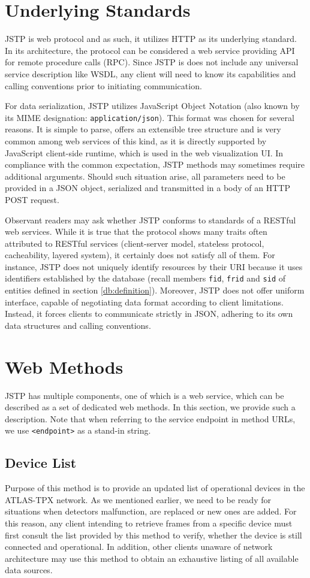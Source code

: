 \section{Underlying Standards}
JSTP is web protocol and as such, it utilizes HTTP as its underlying standard. In its architecture, the protocol can be considered a web service providing API for remote procedure calls (RPC). Since JSTP is does not include any universal service description like WSDL, any client will need to know its capabilities and calling conventions prior to initiating communication.

For data serialization, JSTP utilizes JavaScript Object Notation (also known by its MIME designation: \texttt{application/json}). This format was chosen for several reasons. It is simple to parse, offers an extensible tree structure and is very common among web services of this kind, as it is directly supported by JavaScript client-side runtime, which is used in the web visualization UI. In compliance with the common expectation, JSTP methods may sometimes require additional arguments. Should such situation arise, all parameters need to be provided in a JSON object, serialized and transmitted in a body of an HTTP POST request.

Observant readers may ask whether JSTP conforms to standards of a RESTful web services. While it is true that the protocol shows many traits often attributed to RESTful services (client-server model, stateless protocol, cacheability, layered system), it certainly does not satisfy all of them. For instance, JSTP does not uniquely identify resources by their URI because it uses identifiers established by the database (recall members \texttt{fid}, \texttt{frid} and \texttt{sid} of entities defined in section \ref{db:definition}). Moreover, JSTP does not offer uniform interface, capable of negotiating data format according to client limitations. Instead, it forces clients to communicate strictly in JSON, adhering to its own data structures and calling conventions.

\section{Web Methods}
JSTP has multiple components, one of which is a web service, which can be described as a set of dedicated web methods. In this section, we provide such a description. Note that when referring to the service endpoint in method URLs, we use \texttt{<endpoint>} as a stand-in string.

\subsection{Device List}
Purpose of this method is to provide an updated list of operational devices in the ATLAS-TPX network. As we mentioned earlier, we need to be ready for situations when detectors malfunction, are replaced or new ones are added. For this reason, any client intending to retrieve frames from a specific device must first consult the list provided by this method to verify, whether the device is still connected and operational. In addition, other clients unaware of network architecture may use this method to obtain an exhaustive listing of all available data sources.

